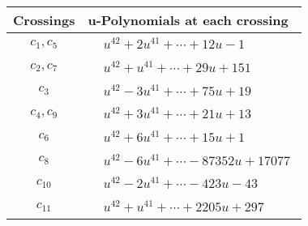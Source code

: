 \documentclass[1p]{elsarticle_modified}
\theoremstyle{definition}
\begin{document}
\begin{tabular}{m{50pt}|m{274pt}}
Crossings & \hspace{64pt}u-Polynomials at each crossing \\
\hline $$\begin{aligned}c_{1},c_{5}\end{aligned}$$&$\begin{aligned}
&u^{42}+2 u^{41}+\cdots+12 u-1
\end{aligned}$\\
\hline $$\begin{aligned}c_{2},c_{7}\end{aligned}$$&$\begin{aligned}
&u^{42}+u^{41}+\cdots+29 u+151
\end{aligned}$\\
\hline $$\begin{aligned}c_{3}\end{aligned}$$&$\begin{aligned}
&u^{42}-3 u^{41}+\cdots+75 u+19
\end{aligned}$\\
\hline $$\begin{aligned}c_{4},c_{9}\end{aligned}$$&$\begin{aligned}
&u^{42}+3 u^{41}+\cdots+21 u+13
\end{aligned}$\\
\hline $$\begin{aligned}c_{6}\end{aligned}$$&$\begin{aligned}
&u^{42}+6 u^{41}+\cdots+15 u+1
\end{aligned}$\\
\hline $$\begin{aligned}c_{8}\end{aligned}$$&$\begin{aligned}
&u^{42}-6 u^{41}+\cdots-87352 u+17077
\end{aligned}$\\
\hline $$\begin{aligned}c_{10}\end{aligned}$$&$\begin{aligned}
&u^{42}-2 u^{41}+\cdots-423 u-43
\end{aligned}$\\
\hline $$\begin{aligned}c_{11}\end{aligned}$$&$\begin{aligned}
&u^{42}+u^{41}+\cdots+2205 u+297
\end{aligned}$\\
\hline
\end{tabular}\\~\\
\end{document}
